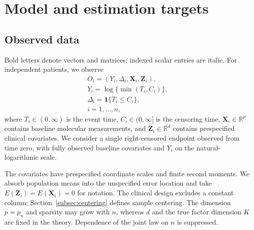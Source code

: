 \section{Model and estimation targets}
\label{sec:model}

\subsection{Observed data}
\label{subsec:observations}
Bold letters denote vectors and matrices; indexed scalar entries are italic. For independent patients, we observe
\begin{equation}
 \begin{gathered}
O_i=(Y_i,\Delta_i,\bm{X}_i,\bm{Z}_i),\\
 Y_i=\log\{\min(T_i,C_i)\},\\
 \Delta_i=\mathbf 1\{T_i\le C_i\},\\
 i=1,\ldots,n,
 \end{gathered}
 \label{eq:observations}
\end{equation}
where $T_i\in(0,\infty)$ is the event time, $C_i\in(0,\infty]$ is the censoring time, $\bm{X}_i\in\mathbb R^p$ contains baseline molecular measurements, and $\bm{Z}_i\in\mathbb R^d$ contains prespecified clinical covariates. We consider a single right-censored endpoint observed from time zero, with fully observed baseline covariates and $Y_i$ on the natural-logarithmic scale.

The covariates have prespecified coordinate scales and finite second moments. We absorb population means into the unspecified error location and take $E(\bm{Z}_i)=E(\bm{X}_i)=0$ for notation. The clinical design excludes a constant column; Section~\ref{subsec:centering} defines sample centering. The dimension $p=p_n$ and sparsity may grow with $n$, whereas $d$ and the true factor dimension $K$ are fixed in the theory. Dependence of the joint law on $n$ is suppressed.


